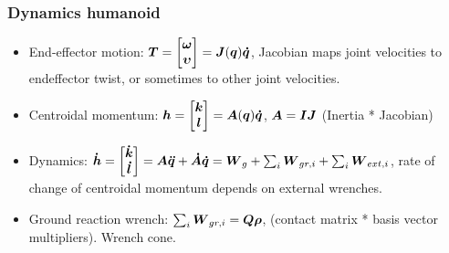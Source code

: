 \subsubsection{Dynamics humanoid}
\begin{itemize}

    \item End-effector motion:
$\boldsymbol{T}=\begin{bmatrix}\boldsymbol{\omega} \\ \boldsymbol{\upsilon} \end{bmatrix} = \boldsymbol{J}(\boldsymbol{q})\boldsymbol{\dot{q}}$, \quad Jacobian maps joint velocities to endeffector twist, or sometimes to other joint velocities.

    \item Centroidal momentum:
$\boldsymbol{h}=\begin{bmatrix}\boldsymbol{k} \\ \boldsymbol{l} \end{bmatrix} =\boldsymbol{A}(\boldsymbol{q})\boldsymbol{\dot{q}}$, \quad $\boldsymbol{A}=\boldsymbol{I}\boldsymbol{J}$ (Inertia * Jacobian)

    \item Dynamics:
$\boldsymbol{\dot{h}}=\begin{bmatrix}\boldsymbol{\dot{k}} \\ \boldsymbol{\dot{l}} \end{bmatrix} =\boldsymbol{A}\boldsymbol{\ddot{q}} +\boldsymbol{\dot{A}}\boldsymbol{\dot{q}} = \boldsymbol{W}_g + \sum_i\boldsymbol{W}_{gr,i} + \sum_i \boldsymbol{W}_{ext,i} $, \quad rate of change of centroidal momentum depends on external wrenches.

    \item Ground reaction wrench:
$\sum_i\boldsymbol{W}_{gr,i}=\boldsymbol{Q}\boldsymbol{\rho}$, \quad (contact matrix * basis vector multipliers). Wrench cone.
\end{itemize}


